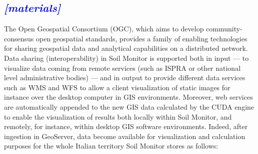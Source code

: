 \documentclass[APA,LATO1COL,doublespace]{WileyNJD-v2}
\newcommand{\update}[1]{\emph{\textcolor{blue}{#1}}}     %
\begin{document}
\subsection{ \update{[materials]}}
The Open Geospatial Consortium (OGC), which aims to develop community-consensus open geospatial standards, provides a family of enabling technologies for sharing geospatial data and analytical capabilities on a distributed network. 
Data sharing (interoperability) in Soil Monitor is supported both in input --- to visualize data coming from remote services (such as ISPRA or other national level administrative bodies) --- and in output to provide different data services such as WMS and WFS to allow a client visualization of static images for instance over the desktop computer in GIS environments.
Moreover, web services are automatically appended to the new GIS data calculated by the CUDA engine to enable the visualization of results both locally within Soil Monitor, and remotely, for instance, within desktop GIS software environments.
Indeed, after ingestion in GeoServer, data become available for visualization and calculation purposes for the whole Italian territory Soil Monitor stores as follows:
\end{document}
